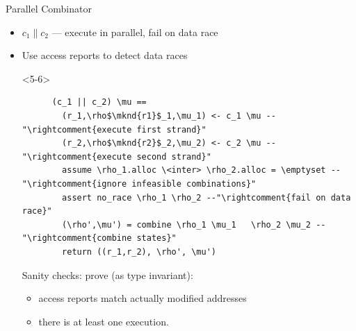 \documentclass[fleqn]{beamer}
\begin{document}
\begin{frame}[t,fragile]{Parallel Combinator}
  \newcommand{\mknd}[1]{\makebox[0pt]{\tikz[remember picture]{\node (#1) {};}}}

  \begin{itemize}
   \item<2-> $c_1 \parallel c_2$ --- execute in parallel, fail on data race
   \item<3-> Use access reports to detect data races



    \begin{onlyenv}<5-6>
    \begin{lstlisting}
      (c_1 || c_2) \mu ==
        (r_1,\rho$\mknd{r1}$_1,\mu_1) <- c_1 \mu --"\rightcomment{execute first strand}"
        (r_2,\rho$\mknd{r2}$_2,\mu_2) <- c_2 \mu --"\rightcomment{execute second strand}"
        assume \rho_1.alloc \<inter> \rho_2.alloc = \emptyset --"\rightcomment{ignore infeasible combinations}"
        assert no_race \rho_1 \rho_2 --"\rightcomment{fail on data race}"
        (\rho',\mu') = combine \rho_1 \mu_1   \rho_2 \mu_2 --"\rightcomment{combine states}"
        return ((r_1,r_2), \rho', \mu')
    \end{lstlisting}

    Sanity checks: prove (as type invariant):
      \begin{itemize}
       \item access reports match actually modified addresses
       \item there is at least one execution.


%


\end{itemize}
\end{onlyenv}
\end{itemize}
\end{frame}
\end{document}

